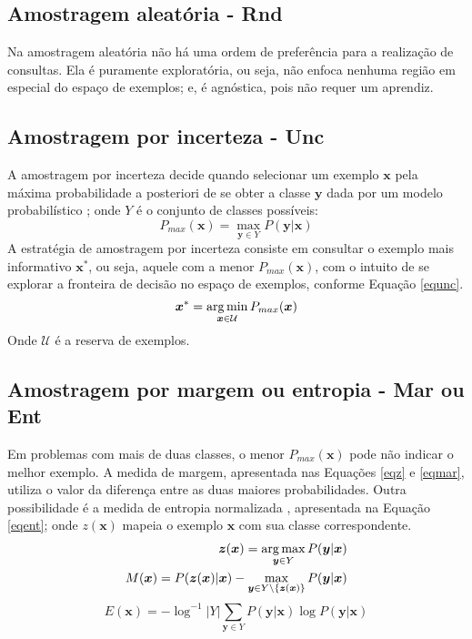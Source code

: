 \subsection{Amostragem aleatória - Rnd}
Na amostragem aleatória não há uma ordem de preferência para a realização de
consultas.
Ela é puramente exploratória, ou seja,
não enfoca nenhuma região em especial do espaço de exemplos; e,
é agnóstica, pois não requer um aprendiz.

\subsection{Amostragem por incerteza - Unc}\label{unc}
A amostragem por incerteza decide quando selecionar um exemplo $\bm{x}$
pela máxima probabilidade a posteriori de se obter a classe $\bm{y}$
dada por um modelo probabilístico \citep{journals/sigir/Lewis95a};
onde $Y$ é o conjunto de classes possíveis:
\begin{equation}
P_{max}(\bm{x})=\max_{\bm{y}\in Y}P(\bm{y}|\bm{x})
\end{equation}
A estratégia de amostragem por incerteza consiste em consultar o exemplo
mais informativo $\bm{x}^*$,
ou seja, aquele com a menor $P_{max}(\bm{x})$,
com o intuito de se explorar a fronteira de decisão no espaço de exemplos, conforme
Equação \ref{equnc}.
\begin{equation} \label{equnc}
 \bm{x}^*= \operatorname*{arg\,min}_{\bm{x}\in\mathcal{U}}P_{max}(\bm{x})
\end{equation}
Onde $\mathcal{U}$ é a reserva de exemplos.

\subsection{Amostragem por margem ou entropia - Mar ou Ent}\label{mar}
Em problemas com mais de duas classes,
o menor $P_{max}(\bm{x})$ pode não indicar o melhor exemplo.
A medida de margem, apresentada nas Equações \ref{eqz} e \ref{eqmar},
utiliza o valor da diferença entre as duas maiores probabilidades.
Outra possibilidade é a medida de entropia normalizada
\citep{journals/bioinformatics/LewinSA0P04}, apresentada na Equação \ref{eqent};
onde $z(\bm{x})$ mapeia o exemplo $\bm{x}$ com sua classe correspondente.
\begin{eqnarray} \label{eqz}
\bm{z}(\bm{x})=\operatorname*{arg\,max}_{\bm{y}\in Y}P(\bm{y}|\bm{x})
\\
M(\bm{x})=P(\bm{z}(\bm{x})|\bm{x})-\max_{\bm{y}\in Y\setminus\{\bm{z}(\bm{x})\}}P(\bm{y}|\bm{x})
\label{eqmar}
\end{eqnarray}
\begin{equation} \label{eqent}
E(\bm{x})=-\log^{-1}|Y|\sum_{\bm{y}\in Y}P(\bm{y}|\bm{x})\log P(\bm{y}|\bm{x})
\end{equation}

